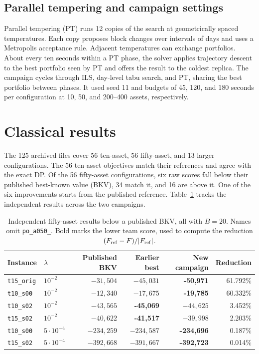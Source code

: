 \documentclass[a4paper]{article}
\begin{document}
\subsection{Parallel tempering and campaign settings}

Parallel tempering (PT) runs 12 copies of the search at geometrically spaced temperatures. Each copy proposes
block changes over intervals of days and uses a Metropolis acceptance rule. Adjacent temperatures can exchange
portfolios. About every ten seconds within a PT phase, the solver applies trajectory descent to the best
portfolio seen by PT and offers the result to the coldest replica.
The campaign cycles through ILS, day-level tabu search, and PT, sharing the best portfolio between phases.
It used seed 11 and budgets of 45, 120, and 180 seconds per configuration at 10, 50, and 200--400 assets,
respectively.

\clearpage
\section{Classical results}

The 125 archived files cover 56 ten-asset, 56 fifty-asset, and 13 larger configurations.
The 56 ten-asset objectives match their references and agree with the exact DP.
Of the 56 fifty-asset configurations, six raw scores fall below their published best-known value (BKV),
34 match it, and 16 are above it. One of the six improvements starts from the published reference.
Table~\ref{tab:classical} tracks the independent results across the two campaigns.

\begin{table}[htbp]
\centering
\caption{Independent fifty-asset results below a published BKV, all with \(B=20\).
Names omit \texttt{po\_a050\_}. Bold marks the lower team score, used to compute the reduction
\((F_{\rm ref}-F)/|F_{\rm ref}|\).}
\label{tab:classical}
\begin{tabular}{@{}llrrrr@{}}
\toprule
Instance & \(\lambda\) & Published BKV & Earlier best & New campaign & Reduction\\
\midrule
\texttt{t15\_orig} & \(10^{-2}\) & \(-31{,}504\) & \(-45{,}031\) & \textbf{-50,971} & 61.792\%\\
\texttt{t10\_s00} & \(10^{-2}\) & \(-12{,}340\) & \(-17{,}675\) & \textbf{-19,785} & 60.332\%\\
\texttt{t10\_s02} & \(10^{-2}\) & \(-43{,}565\) & \textbf{-45,069} & \(-44{,}625\) & 3.452\%\\
\texttt{t15\_s02} & \(10^{-2}\) & \(-40{,}622\) & \textbf{-41,517} & \(-39{,}998\) & 2.203\%\\
\texttt{t10\_s00} & \(5\cdot10^{-4}\) & \(-234{,}259\) & \(-234{,}587\) & \textbf{-234,696} & 0.187\%\\
\texttt{t15\_s02} & \(5\cdot10^{-4}\) & \(-392{,}668\) & \(-391{,}667\) & \textbf{-392,723} & 0.014\%\\
\bottomrule
\end{tabular}
\end{table}
\end{document}
